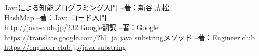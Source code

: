 \documentclass[uplatex,12pt]{jsarticle}
\begin{document}
\begin{thebibliography}{99}
 Javaによる知能プログラミング入門 --著：新谷 虎松 \\
 HashMap --著：Java コード入門 \\
\url{http://java-code.jp/232}
 Google翻訳 --著：Google \\
\url{https://translate.google.com/?hl=ja}
 java substringメソッド --著：Engineer.club \\
\url{https://engineer-club.jp/java-substring}
\end{thebibliography}
\end{document}
